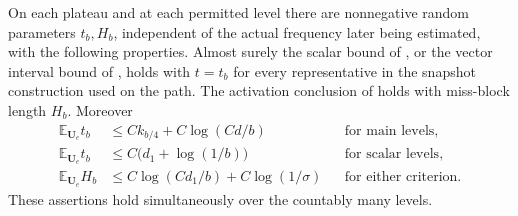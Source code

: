 \begin{lemma}
\label{lemma:paths-simultaneous}
On each plateau and at each permitted level there are nonnegative random
parameters $t_b,H_b$, independent of the actual frequency later being
estimated, with the following properties.  Almost surely the scalar
bound of , or the vector interval bound of
, holds with $t=t_b$ for every representative in
the snapshot construction used on the path.  The activation conclusion
of  holds with miss-block length $H_b$.
Moreover
\begin{align}
 \mathbb E_{\mathbf U_e}t_b
   &\le Ck_{b/4}+C\log(Cd/b) &&\text{for main levels},
       \label{eq:paths-main-parameter}\\
 \mathbb E_{\mathbf U_e}t_b
   &\le C\big(d_1+\log(1/b)\big) &&\text{for scalar levels},
       \label{eq:paths-scalar-parameter}\\
 \mathbb E_{\mathbf U_e}H_b
   &\le C\log(Cd_1/b)+C\log(1/\sigma)
       &&\text{for either criterion}.
       \label{eq:paths-miss-parameter}
\end{align}
These assertions hold simultaneously over the countably many levels.
\end{lemma}

